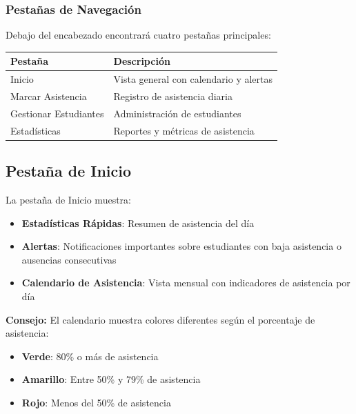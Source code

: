 \documentclass[11pt,a4paper]{article}
\begin{document}
\subsubsection{Pestañas de Navegación}
Debajo del encabezado encontrará cuatro pestañas principales:

\begin{center}
\begin{tabular}{lp{8cm}}
\toprule
\textbf{Pestaña} & \textbf{Descripción} \\
\midrule
Inicio & Vista general con calendario y alertas \\
Marcar Asistencia & Registro de asistencia diaria \\
Gestionar Estudiantes & Administración de estudiantes \\
Estadísticas & Reportes y métricas de asistencia \\
\bottomrule
\end{tabular}
\end{center}

\subsection{Pestaña de Inicio}

La pestaña de Inicio muestra:

\begin{itemize}
  \item \textbf{Estadísticas Rápidas}: Resumen de asistencia del día
  \item \textbf{Alertas}: Notificaciones importantes sobre estudiantes con baja asistencia o ausencias consecutivas
  \item \textbf{Calendario de Asistencia}: Vista mensual con indicadores de asistencia por día
\end{itemize}

\begin{tipbox}
\textbf{Consejo:} El calendario muestra colores diferentes según el porcentaje de asistencia:
\begin{itemize}
  \item \textcolor{primarygreen}{\textbf{Verde}}: 80\% o más de asistencia
  \item \textcolor{warningyellow}{\textbf{Amarillo}}: Entre 50\% y 79\% de asistencia
  \item \textcolor{errorred}{\textbf{Rojo}}: Menos del 50\% de asistencia
\end{itemize}
\end{tipbox}
\end{document}
